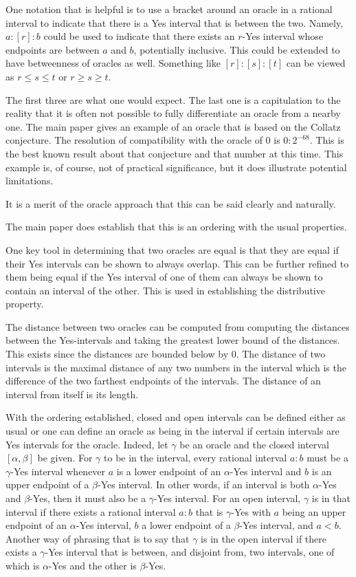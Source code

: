 \documentclass[12pt]{article}
\theoremstyle{remark}
\begin{document}
One notation that is helpful is to use a bracket around an oracle in a rational interval to indicate that there is a Yes interval that is between the two. Namely, $a: [r] : b$ could be used to indicate that there exists an $r$-Yes interval whose endpoints are between $a$ and $b$, potentially inclusive. This could be extended to have betweenness of oracles as well. Something like $[r] : [s] : [t]$ can be viewed as $ r \leq s \leq t$ or $r \geq s \geq t$.

The first three are what one would expect. The last one is a capitulation to the reality that it is often not possible to fully differentiate an oracle from a nearby one. The main paper gives an example of an oracle that is based on the Collatz conjecture. The resolution of compatibility with the oracle of 0 is $0:2^{-68}$. This is the best known result about that conjecture and that number at this time. This example is, of course, not of practical significance, but it does illustrate potential limitations. 

 It is a merit of the oracle approach that this can be said clearly and naturally. 

The main paper does establish that this is an ordering with the usual properties. 

One key tool in determining that two oracles are equal is that they are equal if their Yes intervals can be shown to always overlap. This can be further refined to them being equal if the Yes interval of one of them can always be shown to contain an interval of the other. This is used in establishing the distributive property. 

The distance between two oracles can be computed from computing the distances between the Yes-intervals and taking the greatest lower bound of the distances. This exists since the distances are bounded below by 0. The distance of two intervals is the maximal distance of any two numbers in the interval which is the difference of the two farthest endpoints of the intervals. The distance of an interval from itself is its length. 

With the ordering established, closed and open intervals can be defined either as usual or one can define an oracle as being in the interval if certain intervals are Yes intervals for the oracle. Indeed, let $\gamma$ be an oracle and the closed interval $[\alpha, \beta]$ be given. For $\gamma$ to be in the interval, every rational interval $a:b$ must be a $\gamma$-Yes interval whenever $a$ is a lower endpoint of an $\alpha$-Yes interval and $b$ is an upper endpoint of a $\beta$-Yes interval. In other words, if an interval is both $\alpha$-Yes and $\beta$-Yes, then it must also be a $\gamma$-Yes interval. For an open interval, $\gamma$ is in that interval if there exists a rational interval $a:b$ that is $\gamma$-Yes with $a$ being an upper endpoint of an $\alpha$-Yes interval, $b$ a lower endpoint of a $\beta$-Yes interval, and $a < b$. Another way of phrasing that is to say that $\gamma$ is in the open interval if there exists a $\gamma$-Yes interval that is between, and disjoint from, two intervals, one of which is $\alpha$-Yes and the other is $\beta$-Yes. 
\end{document}
